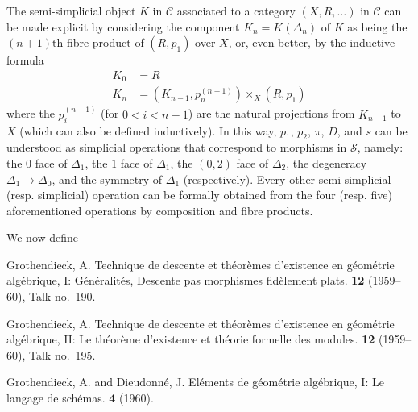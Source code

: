 \documentclass{article}
\renewcommand{\cal}[1]{{\mathcal{#1}}}
\begin{document}
The semi-simplicial object $K$ in $\cal{C}$ associated to a category $(X,R,\ldots)$ in $\cal{C}$ can be made explicit by considering the component $K_n=K(\Delta_n)$ of $K$ as being the $(n+1)$th fibre product of $(R,p_1)$ over $X$, or, even better, by the inductive formula
\[
  \begin{aligned}
    K_0 &= R
  \\K_n &= (K_{n-1},p_n^{(n-1)})\times_X(R,p_1)
  \end{aligned}
\]
where the $p_i^{(n-1)}$ (for $0<i<n-1$) are the natural projections from $K_{n-1}$ to $X$ (which can also be defined inductively).
In this way, $p_1$, $p_2$, $\pi$, $D$, and $s$ can be understood as simplicial operations that correspond to morphisms in $\cal{S}$, namely: the $0$ face of $\Delta_1$, the $1$ face of $\Delta_1$, the $(0,2)$ face of $\Delta_2$, the degeneracy $\Delta_1\to\Delta_0$, and the symmetry of $\Delta_1$ (respectively).
Every other semi-simplicial (resp. simplicial) operation can be formally obtained from the four (resp. five) aforementioned operations by composition and fibre products.

We now define







\nocite{*}
\begin{thebibliography}{3}

  {\sc Grothendieck, A.}
  \newblock Technique de descente et th\'{e}or\`{e}mes d'existence en g\'{e}om\'{e}trie alg\'{e}brique, I: G\'{e}n\'{e}ralit\'{e}s, Descente pas morphismes fid\`{e}lement plats.
   \textbf{12} (1959--60), Talk no.~190.

  {\sc Grothendieck, A.}
  \newblock Technique de descente et th\'{e}or\`{e}mes d'existence en g\'{e}om\'{e}trie alg\'{e}brique, II: Le th\'{e}or\`{e}me d'existence et th\'{e}orie formelle des modules.
   \textbf{12} (1959--60), Talk no.~195.

  {\sc Grothendieck, A. and Dieudonn\'{e}, J.}
  \newblock El\'{e}ments de g\'{e}om\'{e}trie alg\'{e}brique, I: Le langage de sch\'{e}mas.
   \textbf{4} (1960).

\end{thebibliography}
\end{document}
